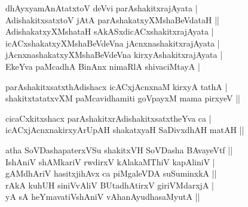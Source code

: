 \begin{entry}
\begin{shl}
dhAyxyamAnAtatxtoV deVvi parAshakitxrajAyata |\\[2pt]
AdishakitxsatxtoV jAtA parAshakatxyXMshaBeVdataH ||\\[2pt]
AdishakatxyXMshataH sAkASxdicACxshakitxrajAyata |\\[2pt]
icACxshakatxyXMshaBeVdeVna jAcnxnashakitxrajAyata |\\[2pt]
jAcnxnashakatxyXMshaBeVdeVna kirxyAshakitxrajAyata |\\[2pt]
EkeYva paMcadhA BinAnx nimaRlA shivaciMtayA |\\[-1pt]
\end{shl}
\medskip
{}
\medskip
\begin{shl}
parAshakitxsatxthAdishacx icACxjAcnxnaM kirxyA tathA |\\[2pt]
shakitxtatatxvXM paMcavidhamiti goVpayxM mama pirxyeV ||\\[-1pt]
\end{shl}
\medskip
{}
\medskip
{}
\medskip
\begin{shl}
cicaCxkitxshacx parAshakitxrAdishakitxsatxtheYva ca |\\[2pt]
icACxjAcnxnakirxyArUpAH shakatxyaH SaDivxdhAH matAH ||\\[-1pt]
\end{shl}
\medskip
{}
\medskip
{}
\medskip
\begin{shl}
atha SoVDashapaterxVSu shakitxVH SoVDasha BAvayeVtf ||\\[2pt]
IshAniV shAMkariV rwdirxV kAlakaMThiV kapAliniV |\\[2pt]
gAMdhAriV hasitxjihAvx ca piMgaleVDA suSuminxkA ||\\[2pt]
rAkA kuhUH siniVvAliV BUtadhAtirxV giriVMdarxjA |\\[2pt]
yA sA heYmavatiVshAniV vAhanAyudhasaMyutA ||\\[-1pt]
\end{shl}
\medskip
{}
\end{entry}



